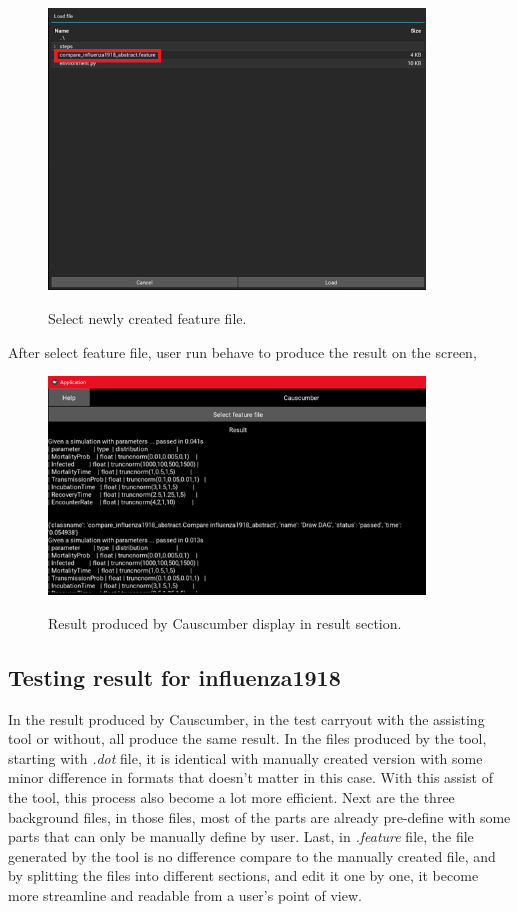\begin{figure}[H]
	\centering
	\includegraphics[width=10cm]{figures/influenzaTestProcess14.png}\\
	\caption{Select newly created feature file.}
	\label{fig:figure32}
\end{figure}
After select feature file, user run behave to produce the result on the screen,
\begin{figure}[H]
	\centering
	\includegraphics[width=10cm]{figures/influenzaTestProcess15.png}\\
	\caption{Result produced by Causcumber display in result section.}
	\label{fig:figure33}
\end{figure}

\subsection{Testing result for influenza1918}
In the result produced by Causcumber, in the test carryout with the assisting tool or without, all produce the same result. In the files produced by the tool, starting with \textsl{.dot} file, it is identical with manually created version with some minor difference in formats that doesn’t matter in this case. With this assist of the tool, this process also become a lot more efficient. Next are the three background files, in those files, most of the parts are already pre-define with some parts that can only be manually define by user. Last, in \textsl{.feature} file, the file generated by the tool is no difference compare to the manually created file, and by splitting the files into different sections, and edit it one by one, it become more streamline and readable from a user’s point of view. 
